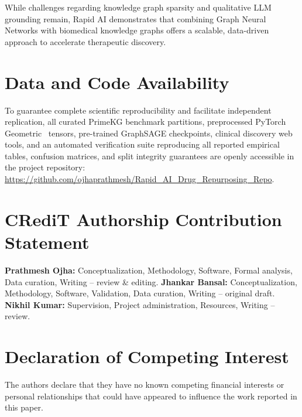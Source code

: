 \documentclass[conference,a4paper]{IEEEtran}
\begin{document}
While challenges regarding knowledge graph sparsity and qualitative LLM grounding remain, Rapid AI demonstrates that combining Graph Neural Networks with biomedical knowledge graphs offers a scalable, data-driven approach to accelerate therapeutic discovery.

\section*{Data and Code Availability}
To guarantee complete scientific reproducibility and facilitate independent replication, all curated PrimeKG benchmark partitions, preprocessed PyTorch Geometric~\cite{ref_pyg} tensors, pre-trained GraphSAGE checkpoints, clinical discovery web tools, and an automated verification suite reproducing all reported empirical tables, confusion matrices, and split integrity guarantees are openly accessible in the project repository: \url{https://github.com/ojhaprathmesh/Rapid_AI_Drug_Repurposing_Repo}.

\section*{CRediT Authorship Contribution Statement}
\textbf{Prathmesh Ojha:} Conceptualization, Methodology, Software, Formal analysis, Data curation, Writing -- review \& editing. 
\textbf{Jhankar Bansal:} Conceptualization, Methodology, Software, Validation, Data curation, Writing -- original draft. 
\textbf{Nikhil Kumar:} Supervision, Project administration, Resources, Writing -- review.

\section*{Declaration of Competing Interest}
The authors declare that they have no known competing financial interests or personal relationships that could have appeared to influence the work reported in this paper.
\end{document}
